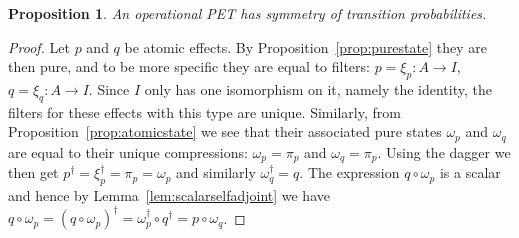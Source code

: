 \documentclass[a4paper,onecolumn,10pt,accepted=2019-05-03, issue=1, volume=1, shorttitle=papers/compositionality-1-1]{compositionalityarticle}
\newcounter{counter}
\numberwithin{counter}{section}
\newtheorem{proposition}[counter]{Proposition}
\begin{document}
\begin{proposition}\label{prop:symoftrans}
    An operational PET has symmetry of transition probabilities.
\end{proposition}
\begin{proof}
    Let $p$ and $q$ be atomic effects. By Proposition~\ref{prop:purestate} they are then pure, and to be more specific they are equal to filters: $p=\xi_p:A\rightarrow I$, $q=\xi_q:A\rightarrow I$. Since $I$ only has one isomorphism on it, namely the identity, the filters for these effects with this type are unique. Similarly, from Proposition~\ref{prop:atomicstate} we see that their associated pure states $\omega_p$ and $\omega_q$ are equal to their unique compressions: $\omega_p = \pi_p$ and $\omega_q = \pi_p$. Using the dagger we then get $p^\dagger = \xi_p^\dagger = \pi_p = \omega_p$ and similarly $\omega_q^\dagger = q$.
    The expression $q\circ \omega_p$ is a scalar and hence by Lemma~\ref{lem:scalarselfadjoint} we have $q\circ \omega_p = (q\circ\omega_p)^\dagger = \omega_p^\dagger \circ q^\dagger = p\circ \omega_q$.
\end{proof}
\end{document}

